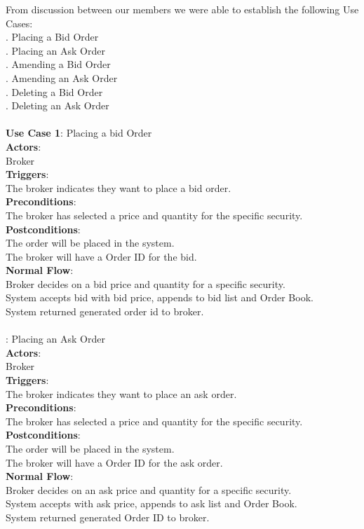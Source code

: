 \documentclass[a4paper]{article}
\begin{document}
From discussion between our members we were able to establish the following Use Cases: \\
\indent{}. Placing a Bid Order	\\
\indent{}. Placing an Ask Order 	\\	
\indent{}. Amending a Bid Order 	\\
\indent{}. Amending an Ask Order \\	
\indent{}. Deleting a Bid Order	\\
\indent{}. Deleting an Ask Order 	\\ 
\\
{\bf Use Case 1}: Placing a bid Order \\ 
{\bf Actors}:\\
\indent Broker \\
{\bf Triggers}: \\
\indent The broker indicates they want to place a bid order. \\
{\bf Preconditions}: \\
\indent The broker has selected a price and quantity for the specific security. \\
{\bf Postconditions}: \\
\indent The order will be placed in the system. \\
\indent The broker will have a Order ID for the bid. \\
{\bf Normal Flow}: \\
\indent Broker decides on a bid price and quantity for a specific security. \\
\indent System accepts bid with bid price, appends to bid list and Order Book. \\
\indent System returned generated order id to broker. \\ \\ 

: Placing an Ask Order \\ 
{\bf Actors}:\\
\indent Broker \\
{\bf Triggers}: \\
\indent The broker indicates they want to place an ask order. \\
{\bf Preconditions}: \\
\indent The broker has selected a price and quantity for the specific security. \\
{\bf Postconditions}: \\
\indent The order will be placed in the system. \\
\indent The broker will have a Order ID for the ask order. \\
{\bf Normal Flow}: \\
\indent Broker decides on an ask price and quantity for a specific security. \\
\indent System accepts with ask price, appends to ask list and Order Book. \\
\indent System returned generated Order ID to broker. \\ \\
\end{document}
